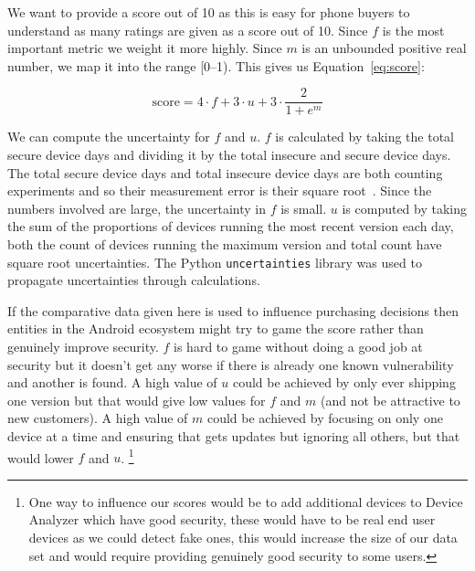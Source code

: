 We want to provide a score out of 10 as this is easy for phone buyers to understand as many ratings are given as a score out of 10.
Since $f$ is the most important metric we weight it more highly.
Since $m$ is an unbounded positive real number, we map it into the range [0--1).
This gives us Equation~\ref{eq:score}:

\begin{equation}
\mathrm{score} = 4 \cdot f + 3 \cdot u + 3 \cdot \frac{2}{1+e^m} \label{eq:score}
\end{equation}

We can compute the uncertainty for $f$ and $u$.
$f$ is calculated by taking the total secure device days and dividing it by the total insecure and secure device days.
The total secure device days and total insecure device days are both counting experiments and so their measurement error is their square root~\cite{Taylor1997}.
Since the numbers involved are large, the uncertainty in $f$ is small.
$u$ is computed by taking the sum of the proportions of devices running the most recent version each day, both the count of devices running the maximum version and total count have square root uncertainties.
The Python \texttt{uncertainties} library was used to propagate uncertainties through calculations.


If the comparative data given here is used to influence purchasing decisions then entities in the Android ecosystem might try to game the score rather than genuinely improve security.
$f$ is hard to game without doing a good job at security but it doesn't get any worse if there is already one known vulnerability and another is found.
A high value of $u$ could be achieved by only ever shipping one version but that would give low values for $f$ and $m$ (and not be attractive to new customers).
A high value of $m$ could be achieved by focusing on only one device at a time and ensuring that gets updates but ignoring all others, but that would lower $f$ and $u$.%
\footnote{One way to influence our scores would be to add additional devices to Device Analyzer which have good security, these would have to be real end user devices as we could detect fake ones, this would increase the size of our data set and would require providing genuinely good security to some users.}

